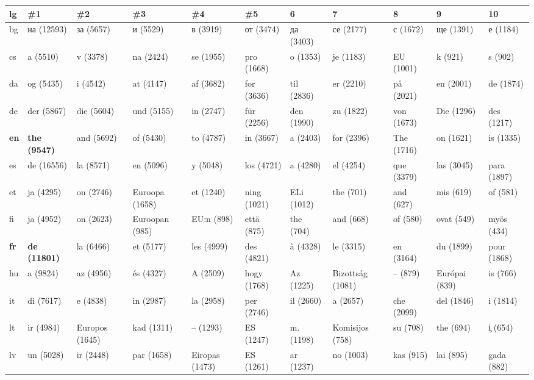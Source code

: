 \begin{tabular}{l|llllllllll}
lg&\#1&\#2&\#3&\#4&\#5&6&7&8&9&10\\
\hline
bg	&\foreignlanguage{russian}{на} (12593)	&\foreignlanguage{russian}{за} (5657)	&\foreignlanguage{russian}{и} (5529)	&\foreignlanguage{russian}{в} (3919)	&\foreignlanguage{russian}{от} (3474)	&\foreignlanguage{russian}{да} (3403)	&\foreignlanguage{russian}{се} (2177)	&\foreignlanguage{russian}{с} (1672)	&\foreignlanguage{russian}{ще} (1391)	&\foreignlanguage{russian}{е} (1184)\\
cs	&a (5510)	&v (3378)	&na (2424)	&se (1955)	&pro (1668)	&o (1353)	&je (1183)	&EU (1001)	&k (921)	&s (902)\\
da	&og (5435)	&i (4542)	&at (4147)	&af (3682)	&for (3636)	&til (2836)	&er (2210)	&på (2021)	&en (2001)	&de (1874)\\
de	&der (5867)	&die (5604)	&und (5155)	&in (2747)	&für (2256)	&den (1990)	&zu (1822)	&von (1673)	&Die (1296)	&des (1217)\\
 \textbf{en}	&\textbf{the (9547)}	&and (5692)	&of (5430)	&to (4787)	&in (3667)	&a (2403)	&for (2396)	&The (1716)	&on (1621)	&is (1335)\\
es	&de (16556)	&la (8571)	&en (5096)	&y (5048)	&los (4721)	&a (4280)	&el (4254)	&que (3379)	&las (3045)	&para (1897)\\
et	&ja (4295)	&on (2746)	&Euroopa (1658)	&et (1240)	&ning (1021)	&ELi (1012)	&the (701)	&and (627)	&mis (619)	&of (581)\\
fi	&ja (4952)	&on (2623)	&Euroopan (985)	&EU:n (898)	&että (875)	&the (704)	&and (668)	&of (580)	&ovat (549)	&myös (434)\\
\textbf{fr}	&\textbf{de (11801)}	&la (6466)	&et (5177)	&les (4999)	&des (4821)	&à (4328)	&le (3315)	&en (3164)	&du (1899)	&pour (1868)\\
hu	&a (9824)	&az (4956)	&és (4327)	&A (2509)	&hogy (1768)	&Az (1225)	&Bizottság (1081)	&– (879)	&Európai (839)	&is (766)\\
it	&di (7617)	&e (4838)	&in (2987)	&la (2958)	&per (2746)	&il (2660)	&a (2657)	&che (2099)	&del (1846)	&i (1814)\\
lt	&ir (4984)	&Europos (1645)	&kad (1311)	&– (1293)	&ES (1247)	&m. (1198)	&Komisijos (758)	&su (708)	&the (694)	&\c i (654)\\
lv	&un (5028)	&ir (2448)	&par (1658)	&Eiropas (1473)	&ES (1261)	&ar (1237)	&no (1003)	&kas (915)	&lai (895)	&gada (882)\\

\end{tabular}
